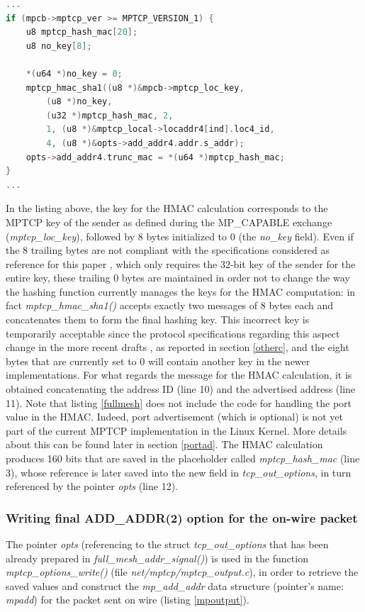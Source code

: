 \begin{lstlisting}[language=c, caption=New ADD\_ADDR HMAC calculation (outgoing IPv4 packet), label=fullmesh]
...
if (mpcb->mptcp_ver >= MPTCP_VERSION_1) {
	u8 mptcp_hash_mac[20];
	u8 no_key[8];

	*(u64 *)no_key = 0;
	mptcp_hmac_sha1((u8 *)&mpcb->mptcp_loc_key,
		(u8 *)no_key,
		(u32 *)mptcp_hash_mac, 2,
		1, (u8 *)&mptcp_local->locaddr4[ind].loc4_id,
		4, (u8 *)&opts->add_addr4.addr.s_addr);
	opts->add_addr4.trunc_mac = *(u64 *)mptcp_hash_mac;
}
...
\end{lstlisting}

In the listing above, the key for the HMAC calculation corresponds to the MPTCP key of the sender as defined during the MP\_CAPABLE exchange (\textit{mptcp\_loc\_key}), followed by 8 bytes initialized to 0 (the \textit{no\_key} field). Even if the 8 trailing bytes are not compliant with the specifications considered as reference for this paper \cite{rfc6824bis04}, which only requires the 32-bit key of the sender for the entire key, these trailing 0 bytes are maintained in order not to change the way the hashing function currently manages the keys for the HMAC computation: in fact \textit{mptcp\_hmac\_sha1()} accepts exactly two messages of 8 bytes each and concatenates them to form the final hashing key. This incorrect key is temporarily acceptable since the protocol specifications regarding this aspect change in the more recent drafts \cite{rfc6824bis05}, as reported in section \ref{otherc}, and the eight bytes that are currently set to 0 will contain another key in the newer implementations.
For what regards the message for the HMAC calculation, it is obtained concatenating the address ID (line 10) and the advertised address (line 11). Note that listing \ref{fullmesh} does not include the code for handling the port value in the HMAC. Indeed, port advertisement (which is optional) is not yet part of the current MPTCP implementation in the Linux Kernel. More details about this can be found later in section \ref{portad}.
The HMAC calculation produces 160 bits that are saved in the placeholder called \textit{mptcp\_hash\_mac} (line 3), whose reference is later saved into the new field in \textit{tcp\_out\_options}, in turn referenced by the pointer \textit{opts} (line 12). 

\subsubsection{Writing final ADD\_ADDR(2) option for the on-wire packet}
The pointer \textit{opts} (referencing to the struct \textit{tcp\_out\_options} that has been already prepared in \textit{full\_mesh\_addr\_signal()}) is used in the function \textit{mptcp\_options\_write()} (file \textit{net/mptcp/mptcp\_output.c}), in order to retrieve the saved values and construct the \textit{mp\_add\_addr} data structure (pointer's name: \textit{mpadd}) for the packet sent on wire (listing \ref{mpoutput}).

